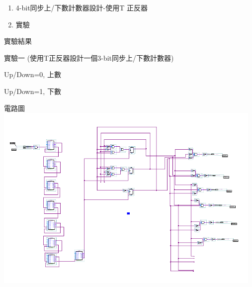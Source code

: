 \documentclass[12pt, a4paper]{article}
\begin{document}
\begin{description}
\begin{enumerate}
          \item 4-bit同步上/下數計數器設計-使用T 正反器 \\
            
          \item 實驗 
        \normalsize
      \end{enumerate}

    \item [二、]實驗結果
      \begin{description}
        \fontsize{20pt}{22pt}\selectfont
        \item 實驗一 (使用T正反器設計一個3-bit同步上/下數計數器)
            \begin{description}
              \fontsize{18pt}{20pt}
                \item [$\bullet$] Up/Down=0, 上數
                \item [$\bullet$] Up/Down=1, 下數
                \item []電路圖 \\[.3cm]
                  \includegraphics[width=13cm]{./image/ex1.png}
            \end{description}
          \normalsize
          

\end{description}
\end{description}
\end{document}
